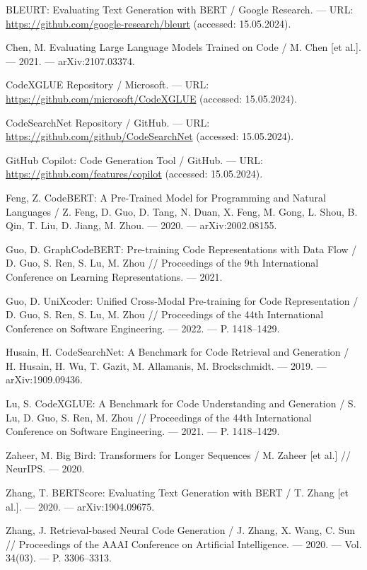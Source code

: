 \documentclass[14pt]{article}
\theoremstyle{definition}
\begin{document}
\begin{thebibliography}{99}
BLEURT: Evaluating Text Generation with BERT / Google Research. — URL: \url{https://github.com/google-research/bleurt} (accessed: 15.05.2024).

Chen, M. Evaluating Large Language Models Trained on Code / M. Chen [et al.]. — 2021. — arXiv:2107.03374.

CodeXGLUE Repository / Microsoft. — URL: \url{https://github.com/microsoft/CodeXGLUE} (accessed: 15.05.2024).

CodeSearchNet Repository / GitHub. — URL: \url{https://github.com/github/CodeSearchNet} (accessed: 15.05.2024).

GitHub Copilot: Code Generation Tool / GitHub. — URL: \url{https://github.com/features/copilot} (accessed: 15.05.2024).

Feng, Z. CodeBERT: A Pre-Trained Model for Programming and Natural Languages / Z. Feng, D. Guo, D. Tang, N. Duan, X. Feng, M. Gong, L. Shou, B. Qin, T. Liu, D. Jiang, M. Zhou. — 2020. — arXiv:2002.08155.

Guo, D. GraphCodeBERT: Pre-training Code Representations with Data Flow / D. Guo, S. Ren, S. Lu, M. Zhou // Proceedings of the 9th International Conference on Learning Representations. — 2021.

Guo, D. UniXcoder: Unified Cross-Modal Pre-training for Code Representation / D. Guo, S. Ren, S. Lu, M. Zhou // Proceedings of the 44th International Conference on Software Engineering. — 2022. — P. 1418–1429.

Husain, H. CodeSearchNet: A Benchmark for Code Retrieval and Generation / H. Husain, H. Wu, T. Gazit, M. Allamanis, M. Brockschmidt. — 2019. — arXiv:1909.09436.

Lu, S. CodeXGLUE: A Benchmark for Code Understanding and Generation / S. Lu, D. Guo, S. Ren, M. Zhou // Proceedings of the 44th International Conference on Software Engineering. — 2021. — P. 1418–1429.

Zaheer, M. Big Bird: Transformers for Longer Sequences / M. Zaheer [et al.] // NeurIPS. — 2020.

Zhang, T. BERTScore: Evaluating Text Generation with BERT / T. Zhang [et al.]. — 2020. — arXiv:1904.09675.

Zhang, J. Retrieval-based Neural Code Generation / J. Zhang, X. Wang, C. Sun // Proceedings of the AAAI Conference on Artificial Intelligence. — 2020. — Vol. 34(03). — P. 3306–3313.


\end{thebibliography}
\end{document}
